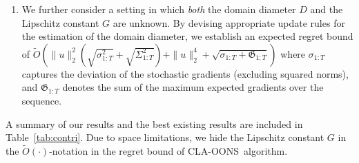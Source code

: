 \documentclass{article}
\theoremstyle{plain}
\theoremstyle{definition}
\theoremstyle{remark}
\newcommand{\claoons}{{\sc CLA-OONS}}
\newcommand{\adnote}[1]{{\color{blue!80!green!20!red} Adarsh: \emph{#1}}}
\renewcommand{\tilde}{\widetilde}
\begin{document}
\begin{enumerate}[leftmargin=*, label=(\arabic*)]
\item[(3)] We further consider a setting in which {\em both} the domain diameter $D$ and the Lipschitz constant $G$ are unknown. By devising appropriate update rules for the estimation of the domain diameter, we establish an expected regret bound of
$\tilde{O}(\|u\|_2^2(\sqrt{\sigma_{1:T}^2}+\sqrt{\Sigma_{1:T}^2})+\|u\|_2^4+\sqrt{\sigma_{1:T} + \mathfrak{G}_{1:T} })$
where $\sigma_{1:T}$ captures the deviation of the stochastic gradients (excluding squared norms), and $\mathfrak{G}_{1:T}$ denotes the sum of the maximum expected gradients over the sequence.


\end{enumerate}
A summary of our results and the best existing results are included in Table~\ref{tab:contri}. Due to space limitations, we hide the Lipschitz constant $G$ in the $\tilde{O}(\cdot)$-notation in the regret bound of \claoons\ algorithm.
\end{document}
